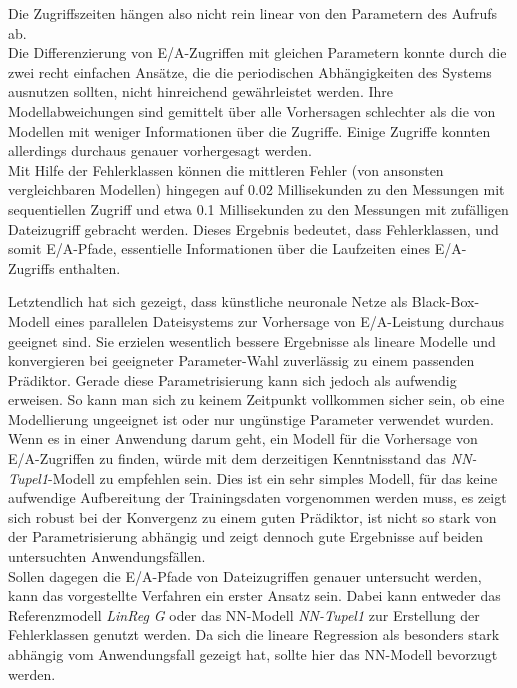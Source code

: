 \documentclass[
	twoside,
	12pt,
	a4paper,
	BCOR10mm,
	DIV14,
	listof=totoc,
	bibliography=totoc,
	headsepline
]{scrreprt}
\begin{document}
Die Zugriffszeiten hängen also nicht rein linear von den Parametern des Aufrufs ab. \\
Die Differenzierung von E/A-Zugriffen mit gleichen Parametern konnte durch die zwei recht einfachen Ansätze, die die periodischen Abhängigkeiten des Systems ausnutzen sollten, nicht hinreichend gewährleistet werden. Ihre Modellabweichungen sind gemittelt über alle Vorhersagen schlechter als die von Modellen mit weniger Informationen über die Zugriffe. Einige Zugriffe konnten allerdings durchaus genauer vorhergesagt werden.\\
Mit Hilfe der Fehlerklassen können die mittleren Fehler (von ansonsten vergleichbaren Modellen) hingegen auf 0.02 Millisekunden zu den Messungen mit sequentiellen Zugriff und etwa 0.1 Millisekunden zu den Messungen mit zufälligen Dateizugriff gebracht werden.
Dieses Ergebnis bedeutet, dass Fehlerklassen, und somit E/A-Pfade, essentielle Informationen über die Laufzeiten eines E/A-Zugriffs enthalten.\medskip

Letztendlich hat sich gezeigt, dass künstliche neuronale Netze als Black-Box-Modell eines parallelen Dateisystems zur Vorhersage von E/A-Leistung durchaus geeignet sind.
Sie erzielen wesentlich bessere Ergebnisse als lineare Modelle und konvergieren bei geeigneter Parameter-Wahl zuverlässig zu einem passenden Prädiktor.
Gerade diese Parametrisierung kann sich jedoch als aufwendig erweisen.
So kann man sich zu keinem Zeitpunkt vollkommen sicher sein, ob eine Modellierung ungeeignet ist oder nur ungünstige Parameter verwendet wurden.\\
Wenn es in einer Anwendung darum geht, ein Modell für die Vorhersage von E/A-Zugriffen zu finden, würde mit dem derzeitigen Kenntnisstand das \textit{NN-Tupel1}-Modell zu empfehlen sein. Dies ist ein sehr simples Modell, für das keine aufwendige Aufbereitung der Trainingsdaten vorgenommen werden muss, es zeigt sich robust bei der Konvergenz zu einem guten Prädiktor, ist nicht so stark von der Parametrisierung abhängig und zeigt dennoch gute Ergebnisse auf beiden untersuchten Anwendungsfällen.\\
Sollen dagegen die E/A-Pfade von Dateizugriffen genauer untersucht werden, kann das vorgestellte Verfahren ein erster Ansatz sein. Dabei kann entweder das Referenzmodell \textit{LinReg G} oder das NN-Modell \textit{NN-Tupel1} zur Erstellung der Fehlerklassen genutzt werden.
Da sich die lineare Regression als besonders stark abhängig vom Anwendungsfall gezeigt hat, sollte hier das NN-Modell bevorzugt werden.
\end{document}
